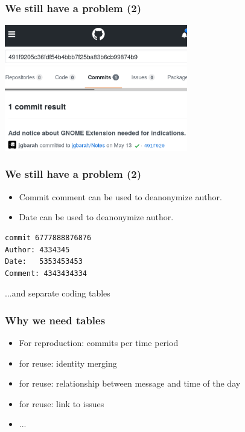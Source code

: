 \documentclass[17pt,aspectratio=169,hyperref={pdfusetitle,colorlinks,allcolors=olive}]{beamer}
\begin{document}
\begin{frame}[fragile]
  \frametitle{We still have a problem (2)}

  \begin{center}
  \includegraphics[width=8cm]{figs/github-hash}
  \end{center}  
  
\end{frame}

\begin{frame}[fragile]
  \frametitle{We still have a problem (2)}

  \begin{itemize}
  \item Commit comment can be used to deanonymize author.
  \item Date can be used to deanonymize author.
  \end{itemize}

{\small
\begin{verbatim}
commit 6777888876876
Author: 4334345
Date:   5353453453
Comment: 4343434334
\end{verbatim}  
}

...and separate coding tables
\end{frame}

\begin{frame}[fragile]
  \frametitle{Why we need tables}

  \begin{itemize}
  \item For reproduction: commits per time period
  \item for reuse: identity merging
  \item for reuse: relationship between message and time of the day
  \item for reuse: link to issues
  \item ...
  \end{itemize}
  
\end{frame}
\end{document}
